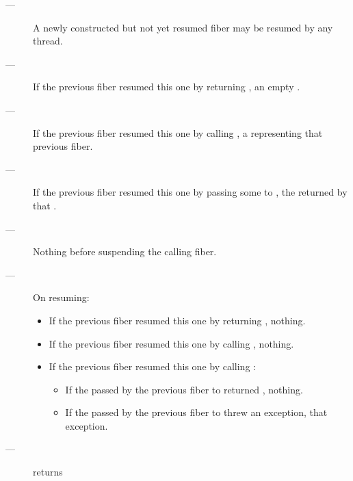 \remarks
\begin{description}
    \item[---] A newly constructed but not yet resumed fiber may be resumed by
              any thread.
\end{description}

\returns
\begin{description}
    \item[---] If the previous fiber resumed this one by returning \fiber,
               an empty \fiber.
    \item[---] If the previous fiber resumed this one by calling \someresume,
               a \fiber representing that previous fiber.
    \item[---] If the previous fiber resumed this one by passing some 
               to \anyresumewith, the \fiber returned by that .
\end{description}

\except
\begin{description}
    \item[---] Nothing before suspending the calling fiber.
    \item[---] On resuming:
    \begin{itemize}
        \item If the previous fiber resumed this one by returning \fiber,
              nothing.
        \item If the previous fiber resumed this one by calling \someresume,
              nothing.
        \item If the previous fiber resumed this one by calling \anyresumewith:
        \begin{itemize}
            \item If the  passed by the previous fiber
                  to \anyresumewith returned \fiber, nothing.
            \item If the  passed by the previous fiber
                  to \anyresumewith threw an exception, that exception.
        \end{itemize}
    \end{itemize}
\end{description}

\postcond
\begin{description}
    \item[---]  returns 
\end{description}

